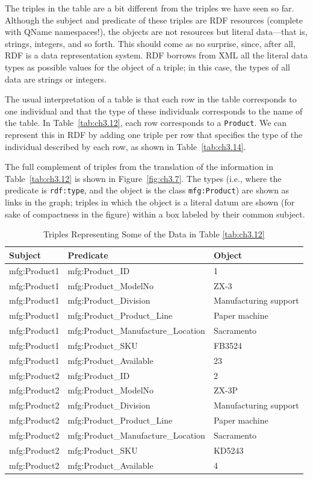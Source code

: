 \begin{challenge}
The triples in the table are a bit different from the triples we have
seen so far. Although the subject and  
predicate of these triples are RDF resources (complete with QName
namespaces!), the objects are not resources but literal data---that is,
strings, integers, and so forth. This should come as no surprise, since,
after all, RDF is a data representation system. RDF borrows from XML all
the literal data types as possible values for the object of a triple; in
this case, the types of all data are strings or integers.

The usual interpretation of a table is that each row in the table
corresponds to one individual and that the type of these individuals
corresponds to the name of the table. In Table~\ref{tab:ch3.12}, each row
corresponds to a \texttt{Product}. We can represent this in RDF by adding one
triple per row that specifies the type of the individual described by
each row, as shown in Table~\ref{tab:ch3.14}.

The full complement of triples from the translation of the information
in Table~\ref{tab:ch3.12} is shown in Figure~\ref{fig:ch3.7}. The types (i.e., where the
predicate is \texttt{rdf:type}, and the object is the class \texttt{mfg:Product}) are
shown as links in the graph; triples in which the object is a literal
datum are shown (for sake of compactness in the figure) within a box
labeled by their common subject.

\begin{table}[h]
\centering
\begin{tabular}{||l l l ||} 
 \hline
 Subject&Predicate&Object \\ [0.5ex] 
 \hline\hline
mfg:Product1&mfg:Product\_ID&1 \\
mfg:Product1&mfg:Product\_ModelNo&ZX-3 \\
mfg:Product1&mfg:Product\_Division&Manufacturing support \\
mfg:Product1&mfg:Product\_Product\_Line&Paper machine \\
mfg:Product1&mfg:Product\_Manufacture\_Location&Sacramento \\
mfg:Product1&mfg:Product\_SKU&FB3524 \\
mfg:Product1&mfg:Product\_Available&23 \\
mfg:Product2&mfg:Product\_ID&2\\
mfg:Product2&mfg:Product\_ModelNo&ZX-3P\\
mfg:Product2&mfg:Product\_Division&Manufacturing support \\
mfg:Product2&mfg:Product\_Product\_Line&Paper machine \\
mfg:Product2&mfg:Product\_Manufacture\_Location&Sacramento\\
mfg:Product2&mfg:Product\_SKU&KD5243\\
mfg:Product2&mfg:Product\_Available&4\\
\hline
\end{tabular}
\caption{Triples Representing Some of the Data in Table \ref{tab:ch3.12}}
\label{tab:ch3.13}
\end{table}


\end{challenge}
